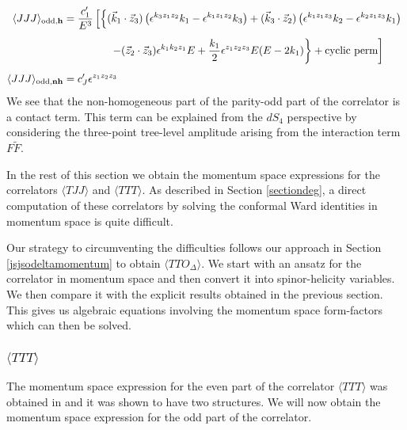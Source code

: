 \documentclass[a4paper,11pt]{article}
\begin{document}
  \begin{align}\label{JJJhn1}
\langle JJJ\rangle_{\text{odd,\bf{h}}}&=\frac{c'_{1}}{E^3}\left[\left\{(\vec{k}_1 \cdot \vec{z}_3)\left(\epsilon^{k_3 z_1 z_2}k_1-\epsilon^{k_1 z_1 z_2}k_3\right)+(\vec{k}_3 \cdot \vec{z}_2)\left(\epsilon^{k_1 z_1 z_3}k_2-\epsilon^{k_2 z_1 z_3}k_1\right)\right.\right.\nonumber\\[5 pt]
&\hspace{1.5cm}\left.\left.-(\vec{z}_2 \cdot \vec{z}_3)\epsilon^{k_1 k_2 z_1}E+\frac{k_1}{2} \epsilon^{z_1 z_2 z_3}E(E-2k_1)\right\}+\text{cyclic perm}\right]\nonumber\\[5 pt]
\langle JJJ\rangle_{\text{odd,\bf{nh}}}&=c'_{J} \epsilon^{z_1z_2z_3}
\end{align}
We see that the non-homogeneous part of the parity-odd part of the correlator is a contact term. This term can be explained from the $dS_4$ perspective by considering the three-point tree-level amplitude arising from the interaction term $F\widetilde F$.

In the rest of this section we obtain the momentum space expressions for the correlators $\langle TJJ \rangle$ and $\langle TTT \rangle$.  As described in Section \ref{sectiondeg}, a direct computation of these correlators by solving the conformal Ward identities in momentum space is quite difficult. 

Our strategy to circumventing the difficulties follows our approach in Section \ref{jsjsodeltamomentum} to obtain $\langle TTO_\Delta\rangle$. We start with an ansatz for the correlator in momentum space and then convert it into spinor-helicity variables. We then compare it with the explicit results obtained in the previous section. This gives us algebraic equations involving the momentum space form-factors which can then be solved. 

\subsubsection*{$\langle TTT \rangle$}
The momentum space expression for the even part of the correlator $\langle TTT \rangle$ was obtained in \cite{Bzowski:2017poo} and it was shown to have two structures. We will now obtain the momentum space expression for the odd part of the correlator. 
\end{document}
